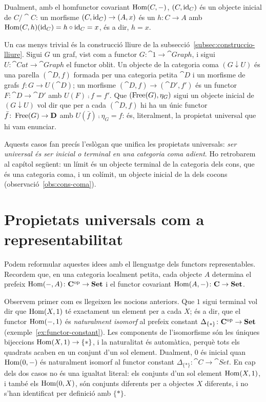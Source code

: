 \begin{exemple}
Dualment, amb el homfunctor covariant $\operatorname{Hom}(C,-)$, $(C,\operatorname{id}_C)$ és un objecte
inicial de $C/\cat{C}$: un morfisme $(C,\operatorname{id}_C)\to(A,x)$ és un $h\colon C\to A$
amb $\operatorname{Hom}(C,h)(\operatorname{id}_C)=h\circ\operatorname{id}_C=x$, és a dir, $h=x$.

Un cas menys trivial és la construcció lliure de la
subsecció~\ref{subsec:construccio-lliure}. Sigui $G$ un graf, vist com a functor
$G\colon\cat{1}\to\cat{Graph}$, i sigui $U\colon\cat{Cat}\to\cat{Graph}$ el
functor oblit. Un objecte de la categoria coma $(G\downarrow U)$ és una parella
$(\cat{D},f)$ formada per una categoria petita $\cat{D}$ i un morfisme de grafs
$f\colon G\to U(\cat{D})$; un morfisme $(\cat{D},f)\to(\cat{D}',f')$ és un
functor $F\colon\cat{D}\to\cat{D}'$ amb $U(F)\comp f=f'$. Que
$(\operatorname{Free}(G),\eta_G)$ sigui un objecte inicial de $(G\downarrow U)$ vol dir que
per a cada $(\cat{D},f)$ hi ha un únic functor $\bar f\colon\operatorname{Free}(G)\to\mathbf{D}$
amb $U(\bar f)\comp\eta_G=f$: és, literalment, la propietat universal que hi
vam enunciar.

Aquests casos fan precís l'eslògan que unifica les propietats universals:
\emph{ser universal és ser inicial o terminal en una categoria coma adient}. Ho
retrobarem al capítol següent: un límit és un objecte terminal de la categoria dels
cons, que és una categoria coma, i un colímit, un objecte inicial de la dels cocons
(observació~\ref{obs:cons-coma}).
\end{exemple}

\section{Propietats universals com a representabilitat}

Podem reformular aquestes idees amb el llenguatge dels functors representables. Recordem que, en una categoria localment petita, cada objecte $A$ determina el prefeix $\operatorname{Hom}(-,A)\colon\mathbf{C}^{\mathrm{op}}\to\mathbf{Set}$ i el functor covariant $\operatorname{Hom}(A,-)\colon\mathbf{C}\to\mathbf{Set}$.

Observem primer com es llegeixen les nocions anteriors. Que $1$ sigui terminal vol dir que $\operatorname{Hom}(X,1)$ té exactament un element per a cada $X$; és a dir, que el functor $\operatorname{Hom}(-,1)$ és \emph{naturalment isomorf} al prefeix constant $\Delta_{\{\ast\}}\colon\mathbf{C}^{\mathrm{op}}\to\mathbf{Set}$ (exemple~\ref{ex:functor-constant}). Les components de l'isomorfisme són les úniques bijeccions $\operatorname{Hom}(X,1)\to\{\ast\}$, i la naturalitat és automàtica, perquè tots els quadrats acaben en un conjunt d'un sol element. Dualment, $0$ és inicial quan $\operatorname{Hom}(0,-)$ és naturalment isomorf al functor constant $\Delta_{\{\ast\}}\colon\cat{C}\to\cat{Set}$. En cap dels dos casos no és una igualtat literal: els conjunts d'un sol element $\operatorname{Hom}(X,1)$, i també els $\operatorname{Hom}(0,X)$, són conjunts diferents per a objectes $X$ diferents, i no s'han identificat per definició amb $\{\ast\}$.

